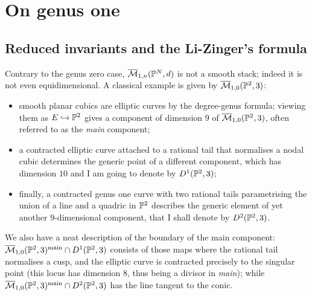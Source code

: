 \chapter{On genus one}\label{ch:hg}

\section{Reduced invariants and the Li-Zinger's formula}\label{sec:redinv}
Contrary to the genus zero case, $\overline{\mathcal{M}}_{1,n}(\mathbb P^N,d)$ is not a smooth stack; indeed it is not even equidimensional. A classical example is given by $\overline{\mathcal{M}}_{1,0}(\mathbb P^2,3)$:
\begin{itemize}
 \item smooth planar cubics are elliptic curves by the degree-genus formula; viewing them as $E\hookrightarrow \mathbb P^2$ gives a component of dimension $9$ of $\overline{\mathcal{M}}_{1,0}(\mathbb P^2,3)$, often referred to as the \emph{main} component;
 \item a contracted elliptic curve attached to a rational tail that normalises a nodal cubic determines the generic point of a different component, which has dimension $10$ and I am going to denote by $D^1(\mathbb P^2,3)$;
 \item finally, a contracted genus one curve with two rational tails parametrising the union of a line and a quadric in $\mathbb P^2$ describes the generic element of yet another $9$-dimensional component, that I shall denote by $D^2(\mathbb P^2,3)$.
\end{itemize}
We also have a neat description of the boundary of the main component: $\overline{\mathcal{M}}_{1,0}(\mathbb P^2,3)^{\mathrm{main}}\cap D^1(\mathbb P^2,3)$ consists of those maps where the rational tail normalises a cusp, and the elliptic curve is contracted precisely to the singular point (this locus has dimension $8$, thus being a divisor in \emph{main}); while $\overline{\mathcal{M}}_{1,0}(\mathbb P^2,3)^{\mathrm{main}}\cap D^2(\mathbb P^2,3)$ has the line tangent to the conic.

